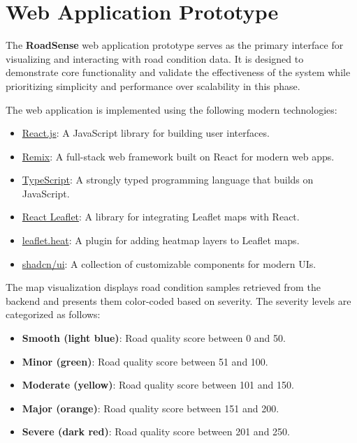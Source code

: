 \section{Web Application Prototype}

The \textbf{RoadSense} web application prototype serves as the primary interface for visualizing and interacting with road condition data. It is designed to demonstrate core functionality and validate the effectiveness of the system while prioritizing simplicity and performance over scalability in this phase.

The web application is implemented using the following modern technologies:
\begin{itemize}
	\item \href{https://reactjs.org/}{React.js}: A JavaScript library for building user interfaces.
	\item \href{https://remix.run/}{Remix}: A full-stack web framework built on React for modern web apps.
	\item \href{https://www.typescriptlang.org/}{TypeScript}: A strongly typed programming language that builds on JavaScript.
	\item \href{https://react-leaflet.js.org/}{React Leaflet}: A library for integrating Leaflet maps with React.
	\item \href{https://github.com/Leaflet/Leaflet.heat}{leaflet.heat}: A plugin for adding heatmap layers to Leaflet maps.
	\item \href{https://ui.shadcn.dev/}{shadcn/ui}: A collection of customizable components for modern UIs.
\end{itemize}

The map visualization displays road condition samples retrieved from the backend and presents them color-coded based on severity. The severity levels are categorized as follows:
\begin{itemize}
	\item \textbf{Smooth (light blue)}: Road quality score between 0 and 50.
	\item \textbf{Minor (green)}: Road quality score between 51 and 100.
	\item \textbf{Moderate (yellow)}: Road quality score between 101 and 150.
	\item \textbf{Major (orange)}: Road quality score between 151 and 200.
	\item \textbf{Severe (dark red)}: Road quality score between 201 and 250.
\end{itemize}

